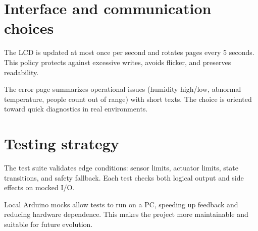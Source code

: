 \section{Interface and communication choices}
The LCD is updated at most once per second and rotates pages every 5 seconds. This policy protects against excessive writes, avoids flicker, and preserves readability.

The error page summarizes operational issues (humidity high/low, abnormal temperature, people count out of range) with short texts. The choice is oriented toward quick diagnostics in real environments.

\section{Testing strategy}
The test suite validates edge conditions: sensor limits, actuator limits, state transitions, and safety fallback. Each test checks both logical output and side effects on mocked I/O.

Local Arduino mocks allow tests to run on a PC, speeding up feedback and reducing hardware dependence. This makes the project more maintainable and suitable for future evolution.
